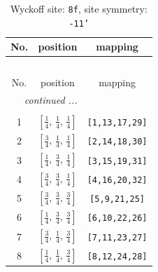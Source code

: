 \documentclass[fleqn,8pt]{jsarticle}
\begin{document}
\begin{longtable}{ccc}
\caption{Wyckoff site: {\tt 8f}, site symmetry: {\tt -11'}}
 \\
 \hline \hline
No. & position & mapping \\ \hline \endfirsthead

\multicolumn{2}{l}{\tablename\ \thetable{}} \\
 \hline \hline
No. & position & mapping \\ \hline \endhead

 \hline \hline
\multicolumn{2}{r}{\footnotesize\it continued ...} \\ \endfoot

 \hline \hline
\multicolumn{2}{r}{} \\ \endlastfoot

1 & $\left[ \frac{1}{4},\, \frac{1}{4},\, \frac{1}{4} \right]$ & {\tt [1,13,17,29]} \\ \hline
2 & $\left[ \frac{3}{4},\, \frac{1}{4},\, \frac{1}{4} \right]$ & {\tt [2,14,18,30]} \\ \hline
3 & $\left[ \frac{1}{4},\, \frac{3}{4},\, \frac{1}{4} \right]$ & {\tt [3,15,19,31]} \\ \hline
4 & $\left[ \frac{3}{4},\, \frac{3}{4},\, \frac{1}{4} \right]$ & {\tt [4,16,20,32]} \\ \hline
5 & $\left[ \frac{3}{4},\, \frac{3}{4},\, \frac{3}{4} \right]$ & {\tt [5,9,21,25]} \\ \hline
6 & $\left[ \frac{1}{4},\, \frac{3}{4},\, \frac{3}{4} \right]$ & {\tt [6,10,22,26]} \\ \hline
7 & $\left[ \frac{3}{4},\, \frac{1}{4},\, \frac{3}{4} \right]$ & {\tt [7,11,23,27]} \\ \hline
8 & $\left[ \frac{1}{4},\, \frac{1}{4},\, \frac{3}{4} \right]$ & {\tt [8,12,24,28]} \\
\end{longtable}
\renewcommand{\arraystretch}{1.2}
\end{document}
